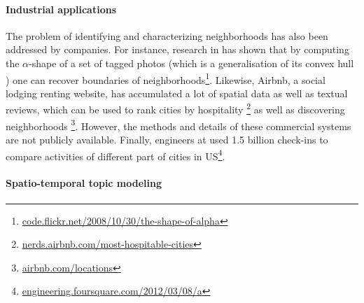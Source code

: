 \paragraph{Industrial applications}

The problem of identifying and characterizing neighborhoods has also been
addressed by companies. For instance, research in \flickr{} has shown that by
computing the $\alpha$-shape of a set of tagged photos (which is a
generalisation of its convex hull \autocite{AlphaShape83}) one can recover
boundaries of
neighborhoods\footnote{\href{http://code.flickr.net/2008/10/30/the-shape-of-alpha/}%
{\url{code.flickr.net/2008/10/30/the-shape-of-alpha}}}. Likewise, Airbnb, a
social lodging renting website, has accumulated a lot of spatial data as well
as textual reviews, which can be used to rank cities by hospitality
\footnote{\href{http://nerds.airbnb.com/most-hospitable-cities/}%
{\url{nerds.airbnb.com/most-hospitable-cities}}} as well as discovering
neighborhoods
\footnote{\href{https://www.airbnb.com/locations}{\url{airbnb.com/locations}}}.
However, the methods and details of these commercial systems are not publicly
available. Finally, engineers at \fs{} used 1.5 billion check-ins to compare
activities of different part of cities in
US\footnote{\href{http://engineering.foursquare.com/2012/03/08/a-hackday-project-what-neighborhood-is-the}%
{\url{engineering.foursquare.com/2012/03/08/a}}}.

\paragraph{Spatio-temporal topic modeling}

